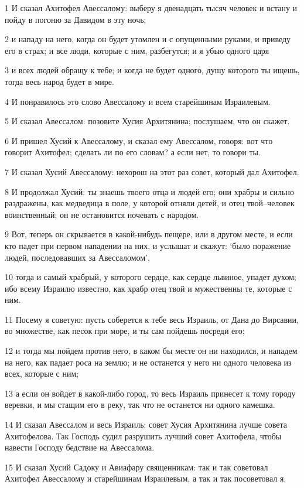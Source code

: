 \par 1 И сказал Ахитофел Авессалому: выберу я двенадцать тысяч человек и встану и пойду в погоню за Давидом в эту ночь;
\par 2 и нападу на него, когда он будет утомлен и с опущенными руками, и приведу его в страх; и все люди, которые с ним, разбегутся; и я убью одного царя
\par 3 и всех людей обращу к тебе; и когда не будет одного, душу которого ты ищешь, тогда весь народ будет в мире.
\par 4 И понравилось это слово Авессалому и всем старейшинам Израилевым.
\par 5 И сказал Авессалом: позовите Хусия Архитянина; послушаем, что он скажет.
\par 6 И пришел Хусий к Авессалому, и сказал ему Авессалом, говоря: вот что говорит Ахитофел; сделать ли по его словам? а если нет, то говори ты.
\par 7 И сказал Хусий Авессалому: нехорош на этот раз совет, который дал Ахитофел.
\par 8 И продолжал Хусий: ты знаешь твоего отца и людей его; они храбры и сильно раздражены, как медведица в поле, у которой отняли детей, и отец твой--человек воинственный; он не остановится ночевать с народом.
\par 9 Вот, теперь он скрывается в какой-нибудь пещере, или в другом месте, и если кто падет при первом нападении на них, и услышат и скажут: `было поражение людей, последовавших за Авессаломом',
\par 10 тогда и самый храбрый, у которого сердце, как сердце львиное, упадет духом; ибо всему Израилю известно, как храбр отец твой и мужественны те, которые с ним.
\par 11 Посему я советую: пусть соберется к тебе весь Израиль, от Дана до Вирсавии, во множестве, как песок при море, и ты сам пойдешь посреди его;
\par 12 и тогда мы пойдем против него, в каком бы месте он ни находился, и нападем на него, как падает роса на землю; и не останется у него ни одного человека из всех, которые с ним;
\par 13 а если он войдет в какой-либо город, то весь Израиль принесет к тому городу веревки, и мы стащим его в реку, так что не останется ни одного камешка.
\par 14 И сказал Авессалом и весь Израиль: совет Хусия Архитянина лучше совета Ахитофелова. Так Господь судил разрушить лучший совет Ахитофела, чтобы навести Господу бедствие на Авессалома.
\par 15 И сказал Хусий Садоку и Авиафару священникам: так и так советовал Ахитофел Авессалому и старейшинам Израилевым, а так и так посоветовал я.
